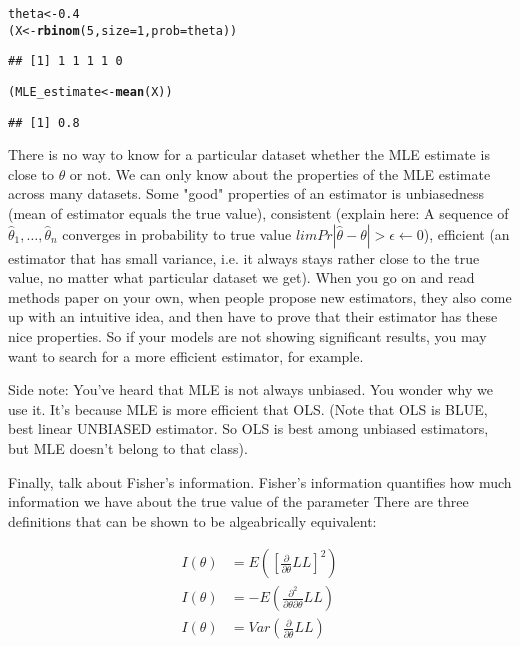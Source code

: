\documentclass{article}\usepackage[]{graphicx}\usepackage[]{color}
\makeatletter
\newcommand{\hlnum}[1]{\textcolor[rgb]{0.686,0.059,0.569}{#1}}%
\newcommand{\hlstd}[1]{\textcolor[rgb]{0.345,0.345,0.345}{#1}}%
\newcommand{\hlkwb}[1]{\textcolor[rgb]{0.69,0.353,0.396}{#1}}%
\newcommand{\hlkwc}[1]{\textcolor[rgb]{0.333,0.667,0.333}{#1}}%
\newcommand{\hlkwd}[1]{\textcolor[rgb]{0.737,0.353,0.396}{\textbf{#1}}}%
\newenvironment{kframe}{%
 \def\at@end@of@kframe{}%
 \ifinner\ifhmode%
  \def\at@end@of@kframe{\end{minipage}}%
  \begin{minipage}{\columnwidth}%
 \fi\fi%
 \def\FrameCommand##1{\hskip\@totalleftmargin \hskip-\fboxsep
 \colorbox{shadecolor}{##1}\hskip-\fboxsep
     \hskip-\linewidth \hskip-\@totalleftmargin \hskip\columnwidth}%
 \MakeFramed {\advance\hsize-\width
   \@totalleftmargin\z@ \linewidth\hsize
   \@setminipage}}%
 {\par\unskip\endMakeFramed%
 \at@end@of@kframe}
\newenvironment{knitrout}{}{} %
\makeatother
\begin{document}
\begin{knitrout}
\color{fgcolor}\begin{kframe}
\begin{alltt}
\hlstd{theta} \hlkwb{<-} \hlnum{0.4}
\hlstd{(X} \hlkwb{<-} \hlkwd{rbinom}\hlstd{(}\hlnum{5}\hlstd{,} \hlkwc{size} \hlstd{=} \hlnum{1}\hlstd{,} \hlkwc{prob} \hlstd{= theta))}
\end{alltt}
\begin{verbatim}
## [1] 1 1 1 1 0
\end{verbatim}
\begin{alltt}
\hlstd{(MLE_estimate} \hlkwb{<-} \hlkwd{mean}\hlstd{(X))}
\end{alltt}
\begin{verbatim}
## [1] 0.8
\end{verbatim}
\end{kframe}
\end{knitrout}

There is no way to know for a particular dataset whether the MLE estimate is close to $\theta$ or not. We can only know about the properties of the MLE estimate across many datasets. Some "good" properties of an estimator is unbiasedness (mean of estimator equals the true value), consistent (explain here: A sequence of $\hat\theta_1, \dots, \hat\theta_n$ converges in probability to true value $lim Pr|\hat \theta - \theta| > \epsilon \leftarrow 0$), efficient (an estimator that has small variance, i.e. it always stays rather close to the true value, no matter what particular dataset we get). When you go on and read methods paper on your own, when people propose new estimators, they also come up with an intuitive idea, and then have to prove that their estimator has these nice properties. So if your models are not showing significant results, you may want to search for a more efficient estimator, for example.

Side note: You've heard that MLE is not always unbiased. You wonder why we use it. It's because MLE is more efficient that OLS. (Note that OLS is BLUE, best linear UNBIASED estimator. So OLS is best among unbiased estimators, but MLE doesn't belong to that class).

Finally, talk about Fisher's information. Fisher's information quantifies how much information we have about the true value of the parameter There are three definitions that can be shown to be algeabrically equivalent:

\begin{align}
I(\theta) &= E \left( \left[ \frac{\partial}{\partial \theta} LL \right]^2 \right) \\
I(\theta) &= - E \left( \frac{\partial^2}{\partial \theta \partial \theta} LL \right) \\
I(\theta) &= Var \left( \frac{\partial}{\partial \theta} LL \right)
\end{align}
\end{document}
